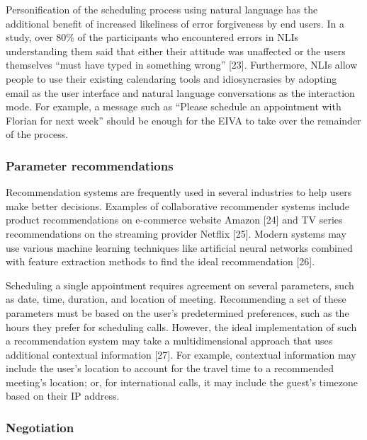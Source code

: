 \documentclass{article}
\begin{document}
Personification of the scheduling process using natural language has the additional benefit of increased likeliness of error forgiveness by end users. In a study, over 80\% of the participants who encountered errors in NLIs understanding them said that either their attitude was unaffected or the users themselves “must have typed in something wrong” [23]. Furthermore, NLIs allow people to use their existing calendaring tools and idiosyncrasies by adopting email as the user interface and natural language conversations as the interaction mode. For example, a message such as “Please schedule an appointment with Florian for next week” should be enough for the EIVA to take over the remainder of the process.

\subsubsection{Parameter recommendations}

Recommendation systems are frequently used in several industries to help users make better decisions. Examples of collaborative recommender systems include product recommendations on e-commerce website Amazon [24] and TV series recommendations on the streaming provider Netflix [25]. Modern systems may use various machine learning techniques like artificial neural networks combined with feature extraction methods to find the ideal recommendation [26].

Scheduling a single appointment requires agreement on several parameters, such as date, time, duration, and location of meeting. Recommending a set of these parameters must be based on the user’s predetermined preferences, such as the hours they prefer for scheduling calls. However, the ideal implementation of such a recommendation system may take a multidimensional approach that uses additional contextual information [27]. For example, contextual information may include the user’s location to account for the travel time to a recommended meeting’s location; or, for international calls, it may include the guest’s timezone based on their IP address.

\subsubsection{Negotiation}
\end{document}
